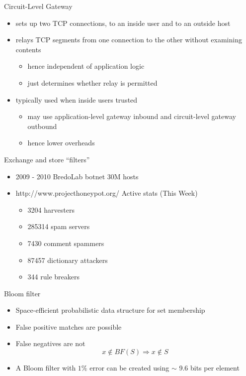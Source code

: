 \documentclass{beamer}
\begin{document}
\begin{frame}{Circuit-Level Gateway}
  \begin{itemize}
  \item sets up two TCP connections, to an inside user 
    and to an outside host 
  \item relays TCP segments from one connection to 
    the other without examining contents 
    \begin{itemize}
    \item hence independent of application logic 
    \item just determines whether relay is permitted 
    \end{itemize}
  \item typically used when inside users trusted 
    \begin{itemize}
    \item may use application-level gateway inbound and 
      circuit-level gateway outbound 
    \item hence lower overheads
    \end{itemize}
  \end{itemize}
\end{frame}

\begin{frame}{Exchange and store ``filters''}
  \begin{itemize}
  \item 2009 - 2010 BredoLab botnet 30M hosts
  \item http://www.projecthoneypot.org/ Active stats (This Week)
  \begin{itemize}
      \item 3204 harvesters
      \item 285314 spam servers
      \item 7430 comment spammers
      \item 87457 dictionary attackers
      \item 344 rule breakers
    \end{itemize}
  \end{itemize}
\end{frame}

\begin{frame}{Bloom filter}
  \begin{itemize}
  \item Space-efficient probabilistic data structure for set membership
  \item False positive matches are possible
  \item False negatives are not
    \[
      x \not \in BF(S) \Rightarrow x \not \in S
    \]
  \item  A Bloom filter with $1\%$ error can be created using
    $\sim$ 9.6 bits per element
  \end{itemize}
\end{frame}
\end{document}
